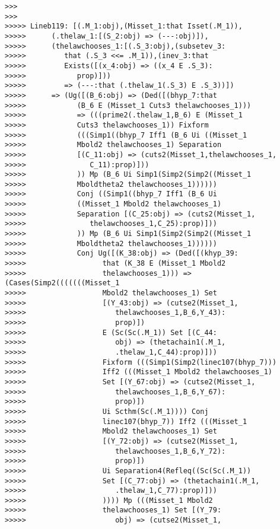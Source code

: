 \documentclass[12pt]{article}
\begin{document}
\begin{verbatim}
>>>
>>>
>>>>> Lineb119: [(.M_1:obj),(Misset_1:that Isset(.M_1)),
>>>>>      (.thelaw_1:[(S_2:obj) => (---:obj)]),
>>>>>      (thelawchooses_1:[(.S_3:obj),(subsetev_3:
>>>>>         that (.S_3 <<= .M_1)),(inev_3:that
>>>>>         Exists([(x_4:obj) => ((x_4 E .S_3):
>>>>>            prop)]))
>>>>>         => (---:that (.thelaw_1(.S_3) E .S_3))])
>>>>>      => (Ug([(B_6:obj) => (Ded([(bhyp_7:that
>>>>>            (B_6 E (Misset_1 Cuts3 thelawchooses_1)))
>>>>>            => (((prime2(.thelaw_1,B_6) E (Misset_1
>>>>>            Cuts3 thelawchooses_1)) Fixform
>>>>>            (((Simp1((bhyp_7 Iff1 (B_6 Ui ((Misset_1
>>>>>            Mbold2 thelawchooses_1) Separation
>>>>>            [(C_11:obj) => (cuts2(Misset_1,thelawchooses_1,
>>>>>               C_11):prop)]))
>>>>>            )) Mp (B_6 Ui Simp1(Simp2(Simp2((Misset_1
>>>>>            Mboldtheta2 thelawchooses_1))))))
>>>>>            Conj ((Simp1((bhyp_7 Iff1 (B_6 Ui
>>>>>            ((Misset_1 Mbold2 thelawchooses_1)
>>>>>            Separation [(C_25:obj) => (cuts2(Misset_1,
>>>>>               thelawchooses_1,C_25):prop)]))
>>>>>            )) Mp (B_6 Ui Simp1(Simp2(Simp2((Misset_1
>>>>>            Mboldtheta2 thelawchooses_1))))))
>>>>>            Conj Ug([(K_38:obj) => (Ded([(khyp_39:
>>>>>                  that (K_38 E (Misset_1 Mbold2
>>>>>                  thelawchooses_1))) => (Cases(Simp2(((((((Misset_1
>>>>>                  Mbold2 thelawchooses_1) Set
>>>>>                  [(Y_43:obj) => (cutse2(Misset_1,
>>>>>                     thelawchooses_1,B_6,Y_43):
>>>>>                     prop)])
>>>>>                  E (Sc(Sc(.M_1)) Set [(C_44:
>>>>>                     obj) => (thetachain1(.M_1,
>>>>>                     .thelaw_1,C_44):prop)]))
>>>>>                  Fixform (((Simp1(Simp2(linec107(bhyp_7)))
>>>>>                  Iff2 (((Misset_1 Mbold2 thelawchooses_1)
>>>>>                  Set [(Y_67:obj) => (cutse2(Misset_1,
>>>>>                     thelawchooses_1,B_6,Y_67):
>>>>>                     prop)])
>>>>>                  Ui Scthm(Sc(.M_1)))) Conj
>>>>>                  linec107(bhyp_7)) Iff2 (((Misset_1
>>>>>                  Mbold2 thelawchooses_1) Set
>>>>>                  [(Y_72:obj) => (cutse2(Misset_1,
>>>>>                     thelawchooses_1,B_6,Y_72):
>>>>>                     prop)])
>>>>>                  Ui Separation4(Refleq((Sc(Sc(.M_1))
>>>>>                  Set [(C_77:obj) => (thetachain1(.M_1,
>>>>>                     .thelaw_1,C_77):prop)]))
>>>>>                  )))) Mp (((Misset_1 Mbold2
>>>>>                  thelawchooses_1) Set [(Y_79:
>>>>>                     obj) => (cutse2(Misset_1,

\end{verbatim}
\end{document}
